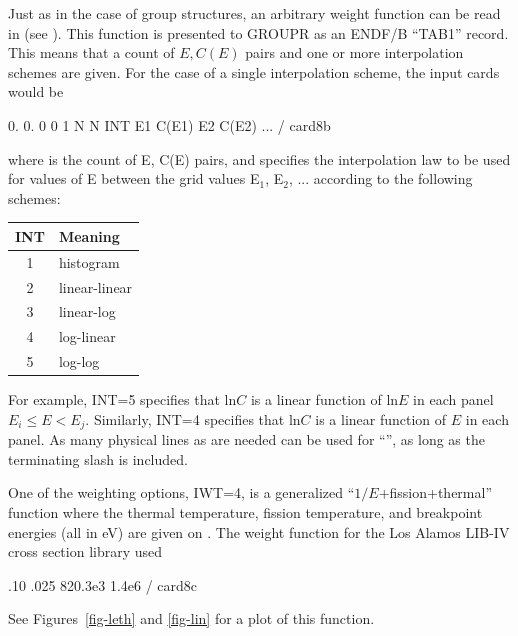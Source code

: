 \noindent
Just as in the case of group structures, an arbitrary weight
function can be read in (see ).  This function is
presented to GROUPR as an ENDF/B ``TAB1'' record.  This means that a
count of $E,C(E)$ pairs and one or more interpolation schemes are given.
For the case of a single interpolation scheme, the input cards would be

\small
\begin{ccode}

   0. 0. 0 0 1 N N INT
   E1 C(E1) E2 C(E2) ... / card8b

\end{ccode}
\normalsize

\noindent
where  is the count of E, C(E) pairs, and  specifies the
interpolation law to be used for values of E between the grid values E$_1$,
E$_2$, ... according to the following schemes:

\begin{center}
\begin{tabular}{cl}
INT & Meaning \\ \hline
1 & histogram\\
2 & linear-linear\\
3 & linear-log\\
4 & log-linear\\
5 & log-log \\ \hline
\end{tabular}
\end{center}

\noindent
For example, INT=5 specifies that ln$C$ is a linear function of ln$E$
in each panel $E_i\le E<E_j$.  Similarly, INT=4 specifies that ln$C$ is
a linear function of $E$ in each panel.  As many physical lines as are
needed can be used for ``'', as long as the terminating
slash is included.

One of the weighting options, IWT=4, is a generalized
``$1/E$+fission+thermal'' function where the thermal temperature,
fission temperature, and breakpoint energies (all in eV) are given
on .  The weight function for the Los Alamos LIB-IV
cross section library\cite{LIBIV} used

\small
\begin{ccode}

   .10 .025 820.3e3 1.4e6 / card8c

\end{ccode}
\normalsize

\noindent
See Figures~\ref{fig-leth} and \ref{fig-lin} for a plot of this function.

